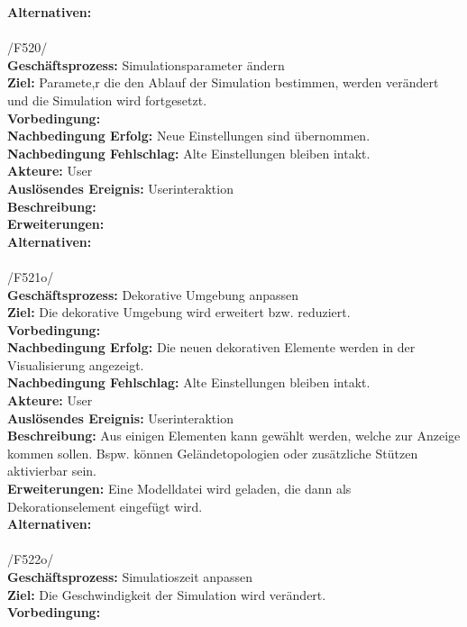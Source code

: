 \textbf{Alternativen:}\\
\\
/F520/\\
\textbf{Geschäftsprozess:} Simulationsparameter ändern\\
\textbf{Ziel:} Paramete,r die den Ablauf der Simulation bestimmen, werden verändert und die Simulation wird fortgesetzt.\\
\textbf{Vorbedingung:}  \\
\textbf{Nachbedingung Erfolg:} Neue Einstellungen sind übernommen.\\
\textbf{Nachbedingung Fehlschlag:} Alte Einstellungen bleiben intakt.\\
\textbf{Akteure:} User\\
\textbf{Auslösendes Ereignis:} Userinteraktion\\
\textbf{Beschreibung:} \\
\textbf{Erweiterungen:}\\
\textbf{Alternativen:}\\
\\
/F521o/\\
\textbf{Geschäftsprozess:} Dekorative Umgebung anpassen\\
\textbf{Ziel:} Die dekorative Umgebung wird erweitert bzw. reduziert.\\
\textbf{Vorbedingung:} \\
\textbf{Nachbedingung Erfolg:} Die neuen dekorativen Elemente werden in der Visualisierung angezeigt.\\
\textbf{Nachbedingung Fehlschlag:} Alte Einstellungen bleiben intakt.\\
\textbf{Akteure:} User\\
\textbf{Auslösendes Ereignis:} Userinteraktion\\
\textbf{Beschreibung:} Aus einigen Elementen kann gewählt werden, welche zur Anzeige kommen sollen. Bspw. können Geländetopologien oder zusätzliche Stützen aktivierbar sein.\\
\textbf{Erweiterungen:} Eine Modelldatei wird geladen, die dann als Dekorationselement eingefügt wird.\\
\textbf{Alternativen:}\\
\\
/F522o/\\
\textbf{Geschäftsprozess:} Simulatioszeit anpassen\\
\textbf{Ziel:} Die Geschwindigkeit der Simulation wird verändert.\\
\textbf{Vorbedingung:} \\
